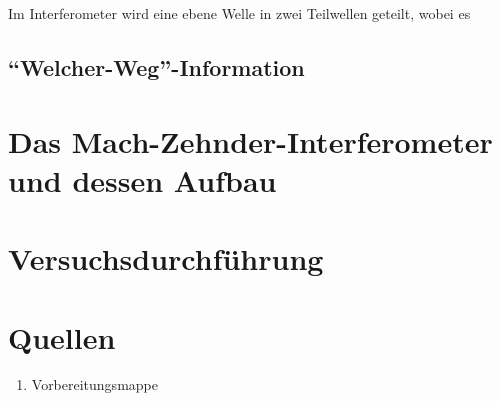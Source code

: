 \documentclass[a4paper,ngerman]{scrartcl}
\begin{document}
Im Interferometer wird eine ebene Welle in zwei Teilwellen geteilt, wobei es 



\subsection{"`Welcher-Weg"'-Information}
\label{sec:welcher-weg}


\clearpage
\section{Das Mach-Zehnder-Interferometer und dessen Aufbau}
\label{sec:mach-zehnder}

\section{Versuchsdurchführung}
\label{sec:versuchsdurchfuhrung}


\clearpage
\section{Quellen}
\begin{enumerate}
\item Vorbereitungsmappe
\end{enumerate}
\end{document}
